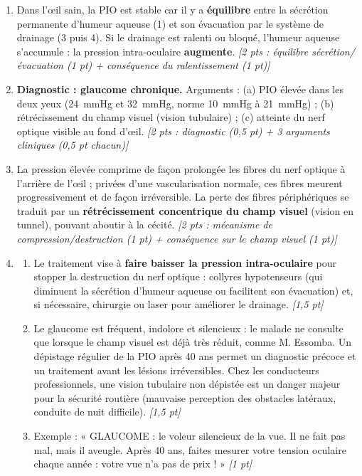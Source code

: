 \documentclass[11pt]{article}
\begin{document}
\begin{corrige}
\begin{enumerate}
\item Dans l'œil sain, la PIO est stable car il y a \textbf{équilibre} entre la sécrétion permanente d'humeur aqueuse (1) et son évacuation par le système de drainage (3 puis 4). Si le drainage est ralenti ou bloqué, l'humeur aqueuse s'accumule : la pression intra-oculaire \textbf{augmente}. \hfill \emph{[2 pts : équilibre sécrétion/évacuation (1 pt) + conséquence du ralentissement (1 pt)]}
\item \textbf{Diagnostic : glaucome chronique.} Arguments : (a) PIO élevée dans les deux yeux (\SI{24}{mmHg} et \SI{32}{mmHg}, norme \SI{10}{mmHg} à \SI{21}{mmHg}) ; (b) rétrécissement du champ visuel (vision tubulaire) ; (c) atteinte du nerf optique visible au fond d'œil. \hfill \emph{[2 pts : diagnostic (0,5 pt) + 3 arguments cliniques (0,5 pt chacun)]}
\item La pression élevée comprime de façon prolongée les fibres du nerf optique à l'arrière de l'œil ; privées d'une vascularisation normale, ces fibres meurent progressivement et de façon irréversible. La perte des fibres périphériques se traduit par un \textbf{rétrécissement concentrique du champ visuel} (vision en tunnel), pouvant aboutir à la cécité. \hfill \emph{[2 pts : mécanisme de compression/destruction (1 pt) + conséquence sur le champ visuel (1 pt)]}
\item \begin{enumerate}
\item Le traitement vise à \textbf{faire baisser la pression intra-oculaire} pour stopper la destruction du nerf optique : collyres hypotenseurs (qui diminuent la sécrétion d'humeur aqueuse ou facilitent son évacuation) et, si nécessaire, chirurgie ou laser pour améliorer le drainage. \hfill \emph{[1,5 pt]}
\item Le glaucome est fréquent, indolore et silencieux : le malade ne consulte que lorsque le champ visuel est déjà très réduit, comme M. Essomba. Un dépistage régulier de la PIO après 40 ans permet un diagnostic précoce et un traitement avant les lésions irréversibles. Chez les conducteurs professionnels, une vision tubulaire non dépistée est un danger majeur pour la sécurité routière (mauvaise perception des obstacles latéraux, conduite de nuit difficile). \hfill \emph{[1,5 pt]}
\item Exemple : « GLAUCOME : le voleur silencieux de la vue. Il ne fait pas mal, mais il aveugle. Après 40 ans, faites mesurer votre tension oculaire chaque année : votre vue n'a pas de prix ! » \hfill \emph{[1 pt]}
\end{enumerate}
\end{enumerate}
\end{corrige}
\end{document}
